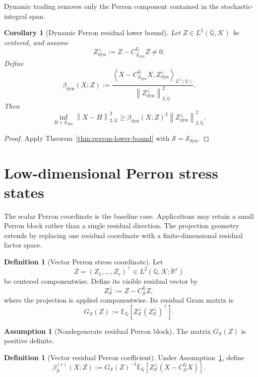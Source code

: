 \documentclass[11pt,a4paper]{amsart}
\theoremstyle{plain}
\newtheorem{corollary}[theorem]{Corollary}
\theoremstyle{definition}
\newtheorem{definition}[theorem]{Definition}
\newtheorem{assumption}[theorem]{Assumption}
\theoremstyle{remark}
\newcommand{\R}{\mathbb{R}}
\newcommand{\QQ}{\mathbb{Q}}
\newcommand{\EE}{\mathbb{E}}
\newcommand{\cK}{\mathcal{K}}
\newcommand{\cS}{\mathcal{S}}
\newcommand{\norm}[1]{\left\lVert #1\right\rVert}
\newcommand{\ip}[2]{\left\langle #1,#2\right\rangle}
\begin{document}
Dynamic trading removes only the Perron component contained in the stochastic-integral span.

\begin{corollary}[Dynamic Perron residual lower bound]\label{cor:dynamic-perron-bound}
Let \(Z\in L^2(\QQ,\cK)\) be centered, and assume
\[
        Z_{\mathrm{dyn}}^\perp
        :=
        Z-C_{\cS_{\mathrm{dyn}}}^{\QQ}Z
        \ne0.
\]
Define
\[
        \beta_{\mathrm{dyn}}(X;Z)
        :=
        \frac{\ip{X-C_{\cS_{\mathrm{dyn}}}^{\QQ}X}{Z_{\mathrm{dyn}}^\perp}_{L^2(\QQ)}}
        {\norm{Z_{\mathrm{dyn}}^\perp}_{2,\QQ}^{2}}.
\]
Then
\[
        \inf_{H\in\cS_{\mathrm{dyn}}}\norm{X-H}_{2,\QQ}^{2}
        \ge
        \beta_{\mathrm{dyn}}(X;Z)^2
        \norm{Z_{\mathrm{dyn}}^\perp}_{2,\QQ}^{2}.
\]
\end{corollary}

\begin{proof}
Apply Theorem~\ref{thm:perron-lower-bound} with \(\cS=\cS_{\mathrm{dyn}}\).
\end{proof}

\section{Low-dimensional Perron stress states}\label{app:vector-perron}

The scalar Perron coordinate is the baseline case.  Applications may retain a small Perron block
rather than a single residual direction.  The projection geometry extends by replacing one residual
coordinate with a finite-dimensional residual factor space.

\begin{definition}[Vector Perron stress coordinate]\label{def:vector-perron}
Let
\[
        Z=(Z_1,\ldots,Z_r)^\top
        \in L^2(\QQ,\cK;\R^r)
\]
be centered componentwise.  Define its visible residual vector by
\[
        Z_{\cS}^{\perp}
        :=
        Z-C_{\cS}^{\QQ}Z,
\]
where the projection is applied componentwise.  Its residual Gram matrix is
\[
        G_{\cS}(Z)
        :=
        \EE_\QQ[Z_{\cS}^{\perp}(Z_{\cS}^{\perp})^\top].
\]
\end{definition}

\begin{assumption}[Nondegenerate residual Perron block]\label{ass:vector-perron-nondegenerate}
The matrix \(G_{\cS}(Z)\) is positive definite.
\end{assumption}

\begin{definition}[Vector residual Perron coefficient]\label{def:vector-perron-beta}
Under Assumption~\ref{ass:vector-perron-nondegenerate}, define
\[
        \beta_{\cS}^{(r)}(X;Z)
        :=
        G_{\cS}(Z)^{-1}
        \EE_\QQ[Z_{\cS}^{\perp}(X-C_{\cS}^{\QQ}X)].
\]
\end{definition}
\end{document}
